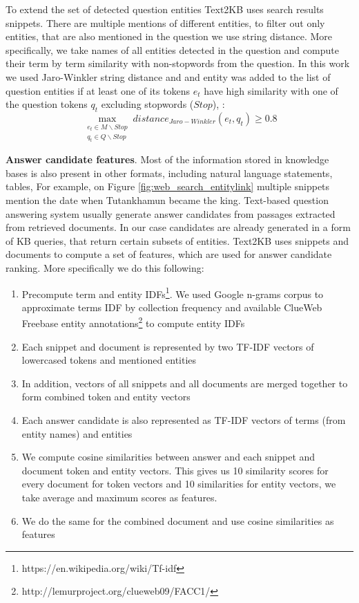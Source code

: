 To extend the set of detected question entities Text2KB uses search results snippets.
There are multiple mentions of different entities, to filter out only entities, that are also mentioned in the question we use string distance.
More specifically, we take names of all entities detected in the question and compute their term by term similarity with non-stopwords from the question.
In this work we used Jaro-Winkler string distance and and entity was added to the list of question entities if at least one of its tokens $e_t$ have high similarity with one of the question tokens $q_t$ excluding stopwords ($Stop$), \ie:
$$\max_{\begin{split}e_t \in M\backslash Stop\\ q_t \in Q\backslash Stop\end{split}} distance_{Jaro-Winkler}(e_t, q_t) \geq 0.8$$

\textbf{Answer candidate features}.
Most of the information stored in knowledge bases is also present in other formats, including natural language statements, tables, \etc
For example, on Figure \ref{fig:web_search_entitylink} multiple snippets mention the date when Tutankhamun became the king.
Text-based question answering system usually generate answer candidates from passages extracted from retrieved documents.
In our case candidates are already generated in a form of KB queries, that return certain subsets of entities.
Text2KB uses snippets and documents to compute a set of features, which are used for answer candidate ranking.
More specifically we do this following:
\begin{enumerate}
\setlength\itemsep{-0.5em}
\item Precompute term and entity IDFs\footnote{https://en.wikipedia.org/wiki/Tf-idf}. We used Google n-grams corpus to approximate terms IDF by collection frequency and available ClueWeb Freebase entity annotations\footnote{http://lemurproject.org/clueweb09/FACC1/} to compute entity IDFs
\item Each snippet and document is represented by two TF-IDF vectors of lowercased tokens and mentioned entities
\item In addition, vectors of all snippets and all documents are merged together to form combined token and entity vectors
\item Each answer candidate is also represented as TF-IDF vectors of terms (from entity names) and entities
\item We compute cosine similarities between answer and each snippet and document token and entity vectors. This gives us 10 similarity scores for every document for token vectors and 10 similarities for entity vectors, we take average and maximum scores as features.
\item We do the same for the combined document and use cosine similarities as features
\end{enumerate}


